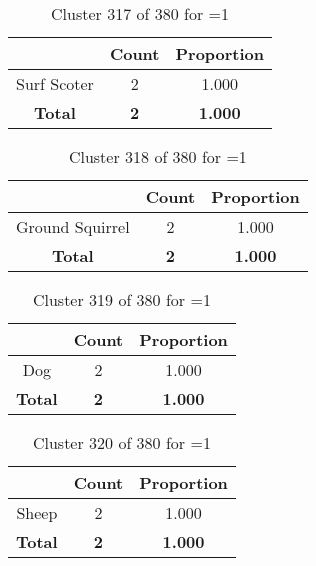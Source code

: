 \begin{table}[ht!]
\centering
\begin{tabular}{|c|c|c|}
\hline
\bf \Spec{} &\bf Count &\bf Proportion\\ \hline \hline
Surf Scoter & 2 & 1.000\\ \hline
\hline
\bf Total & \bf 2 & \bf 1.000\\ \hline
\end{tabular}
\label{tab:cluster:317:1}
\caption{Cluster 317 of 380 for \minneigh{}=1}
\end{table}

\begin{table}[ht!]
\centering
\begin{tabular}{|c|c|c|}
\hline
\bf \Spec{} &\bf Count &\bf Proportion\\ \hline \hline
Ground Squirrel & 2 & 1.000\\ \hline
\hline
\bf Total & \bf 2 & \bf 1.000\\ \hline
\end{tabular}
\label{tab:cluster:318:1}
\caption{Cluster 318 of 380 for \minneigh{}=1}
\end{table}

\begin{table}[ht!]
\centering
\begin{tabular}{|c|c|c|}
\hline
\bf \Spec{} &\bf Count &\bf Proportion\\ \hline \hline
Dog & 2 & 1.000\\ \hline
\hline
\bf Total & \bf 2 & \bf 1.000\\ \hline
\end{tabular}
\label{tab:cluster:319:1}
\caption{Cluster 319 of 380 for \minneigh{}=1}
\end{table}

\clearpage
\begin{table}[ht!]
\centering
\begin{tabular}{|c|c|c|}
\hline
\bf \Spec{} &\bf Count &\bf Proportion\\ \hline \hline
Sheep & 2 & 1.000\\ \hline
\hline
\bf Total & \bf 2 & \bf 1.000\\ \hline
\end{tabular}
\label{tab:cluster:320:1}
\caption{Cluster 320 of 380 for \minneigh{}=1}
\end{table}

